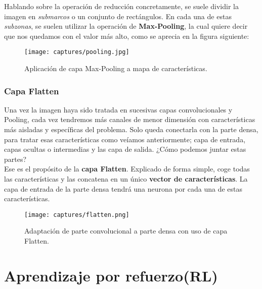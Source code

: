 \documentclass[11pt,fleqn]{book} %
\begin{document}
Hablando sobre la operación de reducción concretamente, se suele dividir la imagen en \textit{submarcos} o un conjunto de rectángulos. En cada una de estas \textit{subzonas}, se suelen utilizar la operación de \textbf{Max-Pooling}, la cual quiere decir que nos quedamos con el valor más alto, como se aprecia en la figura siguiente:

\begin{figure}[H]
	\centering\texttt{[image: captures/pooling.jpg]}
	\caption{Aplicación de capa Max-Pooling a mapa de características.}
	\label{fig:pooling} %
\end{figure}

\subsection{Capa Flatten}\label{sec:flatten}

Una vez la imagen haya sido tratada en sucesivas capas convolucionales y Pooling, cada vez tendremos más canales de menor dimensión con características más aisladas y específicas del problema. Solo queda conectarla con la parte densa, para tratar esas características como veíamos anteriormente; capa de entrada, capas ocultas o intermedias y las capa de salida. ¿Cómo podemos juntar estas partes? \\

Ese es el propósito de la \textbf{capa Flatten}. Explicado de forma simple, coge todas las características y las concatena en un único \textbf{vector de características}. La capa de entrada de la parte densa tendrá una neurona por cada una de estas características.

\begin{figure}[H]
	\centering\texttt{[image: captures/flatten.png]}
	\caption{Adaptación de parte convolucional a parte densa con uso de capa Flatten.}
	\label{fig:flatten} %
\end{figure} 


\chapter{Aprendizaje por refuerzo(RL)}\label{sec:RL}
\end{document}

